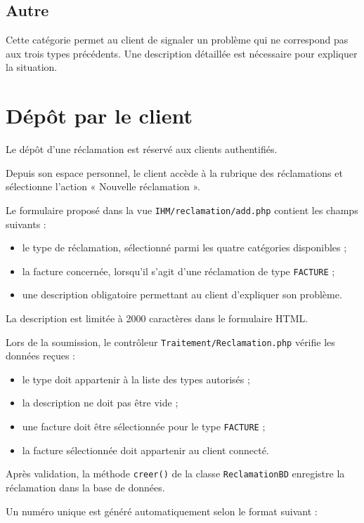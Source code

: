 \subsection{Autre}

Cette catégorie permet au client de signaler un problème qui ne correspond pas aux trois types précédents. Une description détaillée est nécessaire pour expliquer la situation.

\section{Dépôt par le client}

Le dépôt d'une réclamation est réservé aux clients authentifiés.

Depuis son espace personnel, le client accède à la rubrique des réclamations et sélectionne l'action « Nouvelle réclamation ».

Le formulaire proposé dans la vue \texttt{IHM/reclamation/add.php} contient les champs suivants :
\begin{itemize}
    \item le type de réclamation, sélectionné parmi les quatre catégories disponibles ;
    \item la facture concernée, lorsqu'il s'agit d'une réclamation de type \texttt{FACTURE} ;
    \item une description obligatoire permettant au client d'expliquer son problème.
\end{itemize}

La description est limitée à 2000 caractères dans le formulaire HTML.

Lors de la soumission, le contrôleur \texttt{Traitement/Reclamation.php} vérifie les données reçues :
\begin{itemize}
    \item le type doit appartenir à la liste des types autorisés ;
    \item la description ne doit pas être vide ;
    \item une facture doit être sélectionnée pour le type \texttt{FACTURE} ;
    \item la facture sélectionnée doit appartenir au client connecté.
\end{itemize}

Après validation, la méthode \texttt{creer()} de la classe \texttt{ReclamationBD} enregistre la réclamation dans la base de données.

Un numéro unique est généré automatiquement selon le format suivant :

